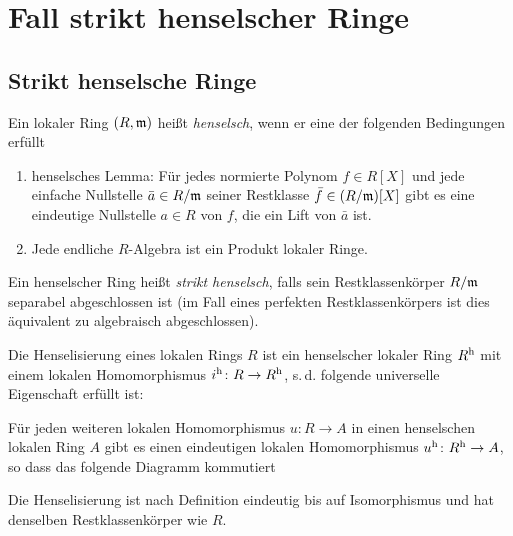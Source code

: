 \documentclass[german]{scrreprt}
\begin{document}
\section{Fall strikt henselscher Ringe}
\subsection{Strikt henselsche Ringe}
\begin{Definition}\label{def:henselscheringe}
  Ein lokaler Ring $(R,\mathfrak{m})$ heißt \emph{henselsch}, wenn
  er eine der folgenden Bedingungen erfüllt
  \begin{enumerate}[label=(\roman*)]
  \item henselsches Lemma:
    Für jedes normierte Polynom $f\in R[X]$ und jede einfache Nullstelle
    $\bar a\in R/\mathfrak{m}$ seiner Restklasse $\bar f\in (R/\mathfrak{m})[X]$
    gibt es eine eindeutige Nullstelle $a\in R$ von $f$, die ein Lift
    von $\bar a$ ist.
  \item Jede endliche $R$-Algebra ist ein Produkt lokaler Ringe.
  \end{enumerate}
  
  Ein henselscher Ring heißt \emph{strikt henselsch}, falls sein
  Restklassenkörper $R/\mathfrak{m}$ separabel abgeschlossen ist
  (im Fall eines perfekten Restklassenkörpers ist dies äquivalent zu
  algebraisch abgeschlossen).
\end{Definition}

\begin{Definition}[Henselisierung]\label{def:henselisierung}
  Die Henselisierung eines lokalen Rings $R$ ist ein henselscher
  lokaler Ring $R^{\text{h}}$ mit einem lokalen Homomorphismus
  $i^\text{h}\colon R\to R^{\text{h}}$, s.\,d. folgende universelle Eigenschaft
  erfüllt ist:
  
  Für jeden weiteren lokalen Homomorphismus $u\colon R\to A$ in einen
  henselschen lokalen Ring $A$ gibt es einen eindeutigen lokalen
  Homomorphismus $u^\text{h}\colon R^{\text{h}}\to A$, so dass das folgende Diagramm
  kommutiert
  \begin{center}
  \end{center}

  Die Henselisierung ist nach Definition eindeutig bis auf
  Isomorphismus und hat denselben Restklassenkörper wie $R$.
\end{Definition}
\end{document}
